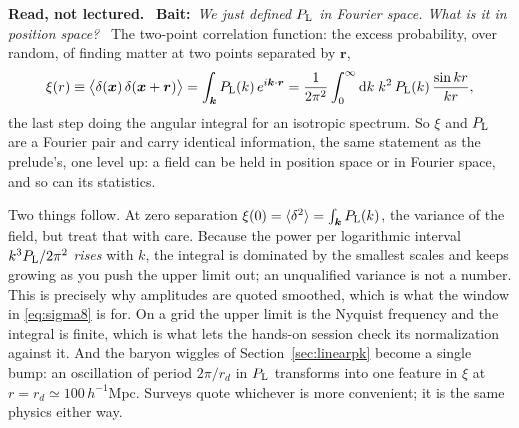 \documentclass[a4paper,11pt]{article}
\newcommand{\vx}{\bm{x}}
\newcommand{\vk}{\bm{k}}
\newcommand{\vr}{\bm{r}}
\def\Plin{P_{\rm L}}
\newcommand{\dd}{\mathrm{d}}
\numberwithin{equation}{section}
\newenvironment{reading}
  {\par\medskip\noindent\begingroup\small\color{black!58}%
   \textbf{Read, not lectured.}\ }
  {\endgroup\par\medskip}
\newcommand{\bait}[1]{\textbf{Bait:}\ \emph{#1}\ }
\begin{document}
\begin{reading}
\bait{We just defined $\Plin$ in Fourier space. What is it in position space?}
The two-point correlation function: the excess probability, over random, of
finding matter at two points separated by $\vr$,
\begin{equation*}
\xi(r) \equiv \big\langle \delta(\vx)\,\delta(\vx+\vr)\big\rangle
= \int_{\vk} \Plin(k)\,e^{i\vk\cdot\vr}
= \frac{1}{2\pi^2}\int_0^\infty \dd k\; k^2\,\Plin(k)\,\frac{\sin kr}{kr} ,
\end{equation*}
the last step doing the angular integral for an isotropic spectrum. So
$\xi$ and $\Plin$ are a Fourier pair and carry identical information, the same statement as the prelude's, one level up: a field can be held in position
space or in Fourier space, and so can its statistics.

Two things follow. At zero separation $\xi(0) = \langle\delta^2\rangle =
\int_{\vk}\Plin(k)$, the variance of the field, but treat that with care.
Because the power per logarithmic interval $k^3\Plin/2\pi^2$ \emph{rises} with
$k$, the integral is dominated by the smallest scales and keeps growing as you
push the upper limit out; an unqualified variance is not a number. This is
precisely why amplitudes are quoted smoothed, which is what the window in
\eqref{eq:sigma8} is for. On a grid the upper limit is the Nyquist frequency and
the integral is finite, which is what lets the hands-on session check its
normalization against it. And the baryon wiggles of
Section~\ref{sec:linearpk} become a single bump: an oscillation of period
$2\pi/r_d$ in $\Plin$ transforms into one feature in $\xi$ at $r = r_d \simeq
100\,h^{-1}$Mpc. Surveys quote whichever is more convenient; it is the same
physics either way.
\end{reading}
\end{document}
